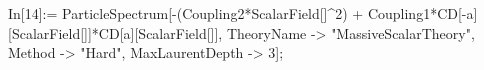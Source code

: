 In[14]:= ParticleSpectrum[-(Coupling2*ScalarField[]^2) + Coupling1*CD[-a][ScalarField[]]*CD[a][ScalarField[]], TheoryName -> "MassiveScalarTheory", Method -> "Hard", MaxLaurentDepth -> 3]; 